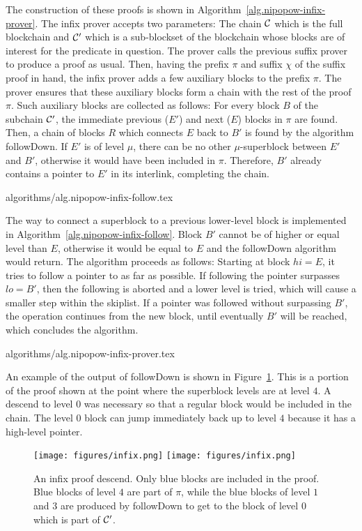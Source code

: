 The construction of these proofs is shown in
Algorithm~\ref{alg.nipopow-infix-prover}. The infix prover accepts two
parameters: The chain $\mathcal{C}$ which is the full blockchain and $\mathcal{C}'$ which
is a sub-blockset of the blockchain whose blocks are of interest for the
predicate in question. The prover calls the previous suffix prover to produce a
proof as usual. Then, having the prefix $\pi$ and suffix $\chi$ of the suffix
proof in hand, the infix prover adds a few auxiliary blocks to the prefix $\pi$.
The prover ensures that these auxiliary blocks form a chain with the rest of the
proof $\pi$. Such auxiliary blocks are collected as follows: For every block $B$
of the subchain $\mathcal{C}'$, the immediate previous ($E'$) and next ($E$) blocks
in $\pi$ are found. Then, a chain of blocks $R$ which connects $E$ back to $B'$
is found by the algorithm followDown. If $E'$ is of level $\mu$, there can be no
other $\mu$-superblock between $E'$ and $B'$, otherwise it would have been
included in $\pi$. Therefore, $B'$ already contains a pointer to $E'$ in its
interlink, completing the chain.

{algorithms/alg.nipopow-infix-follow.tex}

The way to connect a superblock to a previous lower-level block is implemented
in Algorithm~\ref{alg.nipopow-infix-follow}.  Block $B'$ cannot be of higher or
equal level than $E$, otherwise it would be equal to $E$ and the followDown
algorithm would return. The algorithm proceeds as follows: Starting at block $hi =
E$, it tries to follow a pointer to as far as possible. If following the pointer
surpasses $lo = B'$, then the following is aborted and a lower level is tried,
which will cause a smaller step within the skiplist. If a pointer was followed
without surpassing $B'$, the operation continues from the new block, until
eventually $B'$ will be reached, which concludes the algorithm.

{algorithms/alg.nipopow-infix-prover.tex}

An example of the output of followDown is shown in Figure~\ref{fig.infix}. This
is a portion of the proof shown at the point where the superblock levels are at
level $4$. A descend to level $0$ was necessary so that a regular block would be
included in the chain. The level $0$ block can jump immediately back up to level
$4$ because it has a high-level pointer.

\begin{figure}[h]
    \caption{An infix proof descend. Only blue blocks are included in the proof.
    Blue blocks of level $4$ are part of $\pi$, while the blue blocks of level
    $1$ and $3$ are produced by followDown to get to the block of level $0$
    which is part of $\mathcal{C}'$.}
    \centering
    \iftwocolumn
        \texttt{[image: figures/infix.png]}
    \else
        \texttt{[image: figures/infix.png]}
    \fi
    \label{fig.infix}
\end{figure}

